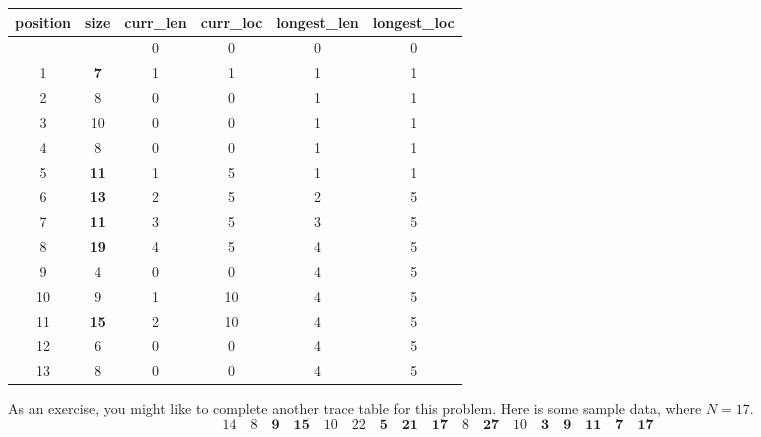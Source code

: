\begin{inlinetable}
  \begin{tabular}{S[table-format=2.0]S[table-format=2.0]S[table-format=2.0]
    S[table-format=2.0]S[table-format=2.0]S[table-format=2.0]}
    \toprule
    {position} & {size}       & {curr\_len} & {curr\_loc} & {longest\_len} & {longest\_loc} \\
    \midrule
               &              & 0           & 0           & 0              & 0              \\
    1          & \bfseries 7  & 1           & 1           & 1              & 1              \\
    2          & 8            & 0           & 0           & 1              & 1              \\
    3          & 10           & 0           & 0           & 1              & 1              \\
    4          & 8            & 0           & 0           & 1              & 1              \\
    5          & \bfseries 11 & 1           & 5           & 1              & 1              \\
    6          & \bfseries 13 & 2           & 5           & 2              & 5              \\
    7          & \bfseries 11 & 3           & 5           & 3              & 5              \\
    8          & \bfseries 19 & 4           & 5           & 4              & 5              \\
    9          & 4            & 0           & 0           & 4              & 5              \\
    10         & 9            & 1           & 10          & 4              & 5              \\
    11         & \bfseries 15 & 2           & 10          & 4              & 5              \\
    12         & 6            & 0           & 0           & 4              & 5              \\
    13         & 8            & 0           & 0           & 4              & 5              \\
    \bottomrule
  \end{tabular}
\end{inlinetable}

As an exercise, you might like to complete another trace table for this problem. Here is
some sample data, where $N=17$.\[
  14 \quad 8 \quad 
  \mathbf{9} \quad \mathbf{15} \quad
  10 \quad 22 \quad 
  \mathbf{5} \quad \mathbf{21} \quad \mathbf{17} \quad 
  8 \quad
  \mathbf{27} \quad
  10 \quad
  \mathbf{3} \quad \mathbf{9} \quad \mathbf{11} \quad \mathbf{7} \quad \mathbf{17}
\]


